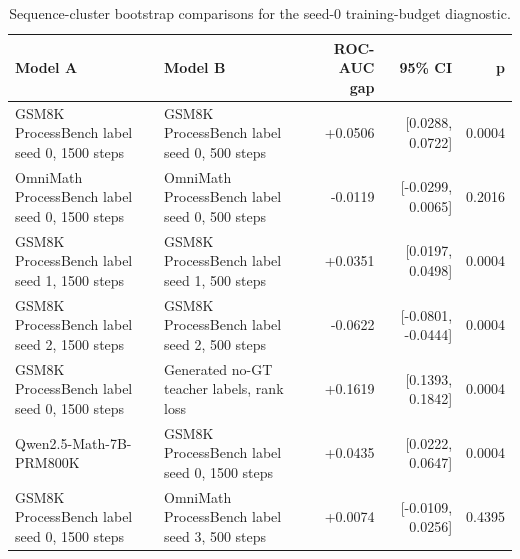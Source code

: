 \begin{table}[t]
\centering
\small
\begin{tabular}{llrrr}
\toprule
Model A & Model B & ROC-AUC gap & 95\% CI & p \\
\midrule
GSM8K ProcessBench label seed 0, 1500 steps & GSM8K ProcessBench label seed 0, 500 steps & +0.0506 & [0.0288, 0.0722] & 0.0004 \\
OmniMath ProcessBench label seed 0, 1500 steps & OmniMath ProcessBench label seed 0, 500 steps & -0.0119 & [-0.0299, 0.0065] & 0.2016 \\
GSM8K ProcessBench label seed 1, 1500 steps & GSM8K ProcessBench label seed 1, 500 steps & +0.0351 & [0.0197, 0.0498] & 0.0004 \\
GSM8K ProcessBench label seed 2, 1500 steps & GSM8K ProcessBench label seed 2, 500 steps & -0.0622 & [-0.0801, -0.0444] & 0.0004 \\
GSM8K ProcessBench label seed 0, 1500 steps & Generated no-GT teacher labels, rank loss & +0.1619 & [0.1393, 0.1842] & 0.0004 \\
Qwen2.5-Math-7B-PRM800K & GSM8K ProcessBench label seed 0, 1500 steps & +0.0435 & [0.0222, 0.0647] & 0.0004 \\
GSM8K ProcessBench label seed 0, 1500 steps & OmniMath ProcessBench label seed 3, 500 steps & +0.0074 & [-0.0109, 0.0256] & 0.4395 \\
\bottomrule
\end{tabular}
\caption{Sequence-cluster bootstrap comparisons for the seed-0 training-budget diagnostic.}
\label{tab:phase-b-training-budget-ci}
\end{table}
